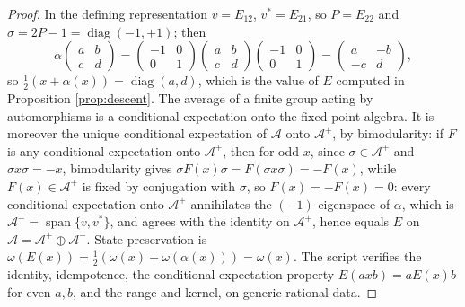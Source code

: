 \documentclass[11pt]{article}
\theoremstyle{definition}
\newcommand{\Aa}{\mathcal{A}}
\newcommand{\Aev}{\mathcal{A}^{+}}
\newcommand{\Aod}{\mathcal{A}^{-}}
\begin{document}
\begin{proof}
In the defining representation $v = E_{12}$, $v^{*} = E_{21}$, so $P = E_{22}$ and $\sigma = 2P - 1 = \operatorname{diag}(-1, +1)$; then
\[
\alpha\begin{pmatrix} a & b \\ c & d \end{pmatrix}
= \begin{pmatrix} -1 & 0 \\ 0 & 1\end{pmatrix}\begin{pmatrix} a & b \\ c & d \end{pmatrix}\begin{pmatrix} -1 & 0 \\ 0 & 1\end{pmatrix}
= \begin{pmatrix} a & -b \\ -c & d \end{pmatrix},
\]
so $\tfrac12(x + \alpha(x)) = \operatorname{diag}(a,d)$, which is the value of $E$ computed in Proposition \ref{prop:descent}. The average of a finite group acting by automorphisms is a conditional expectation onto the fixed-point algebra. It is moreover the unique conditional expectation of $\Aa$ onto $\Aev$, by bimodularity: if $F$ is any conditional expectation onto $\Aev$, then for odd $x$, since $\sigma \in \Aev$ and $\sigma x \sigma = -x$, bimodularity gives $\sigma F(x) \sigma = F(\sigma x \sigma) = -F(x)$, while $F(x) \in \Aev$ is fixed by conjugation with $\sigma$, so $F(x) = -F(x) = 0$: every conditional expectation onto $\Aev$ annihilates the $(-1)$-eigenspace of $\alpha$, which is $\Aod = \operatorname{span}\{v, v^{*}\}$, and agrees with the identity on $\Aev$, hence equals $E$ on $\Aa = \Aev \oplus \Aod$. State preservation is $\omega(E(x)) = \tfrac12(\omega(x) + \omega(\alpha(x))) = \omega(x)$. The script verifies the identity, idempotence, the conditional-expectation property $E(axb) = aE(x)b$ for even $a, b$, and the range and kernel, on generic rational data.
\end{proof}
\end{document}
